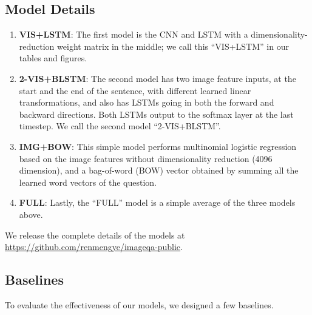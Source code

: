 \documentclass{article} %
\renewcommand{\#}[1]{\textbf{#1}}
\begin{document}
\subsection{Model Details}

\begin{enumerate}[leftmargin=*]

\item \#{VIS+LSTM}: The first model is the CNN and LSTM with a
dimensionality-reduction weight matrix in the middle; we call this ``VIS+LSTM''
in our tables and figures.

\item \#{2-VIS+BLSTM}: The second model has two image feature inputs, at the
start and the end of the sentence, with different learned linear
transformations, and also has LSTMs going in both the forward and backward
directions. Both LSTMs output to the softmax layer at the last timestep. We
call the second model ``2-VIS+BLSTM''.

\item \#{IMG+BOW}: This simple model performs multinomial logistic regression
based on the image features without dimensionality reduction (4096 dimension),
and a bag-of-word (BOW) vector obtained by summing all the learned word vectors
of the question.

\item \#{FULL}: Lastly, the ``FULL'' model is a simple average of the three
models above.

\end{enumerate}

We release the complete details of the models at
\url{https://github.com/renmengye/imageqa-public}.

\subsection{Baselines}

To evaluate the effectiveness of our models, we designed a few baselines.
\end{document}
